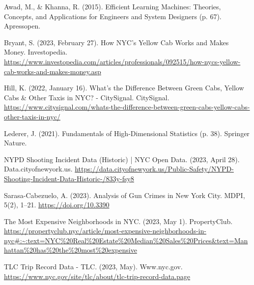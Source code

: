 \documentclass[11pt]{article}
\begin{document}
\printbibliography
\begin{thebibliography}{9}
Awad, M., \& Khanna, R. (2015). Efficient Learning Machines: Theories, Concepts, and Applications for Engineers and System Designers (p. 67). Apressopen.

Bryant, S. (2023, February 27). How NYC’s Yellow Cab Works and Makes Money. Investopedia. \url{https://www.investopedia.com/articles/professionals/092515/how-nycs-yellow-cab-works-and-makes-money.asp}

Hill, K. (2022, January 16). What’s the Difference Between Green Cabs, Yellow Cabs \& Other Taxis in NYC? - CitySignal. CitySignal. \url{https://www.citysignal.com/whats-the-difference-between-green-cabs-yellow-cabs-other-taxis-in-nyc/}

Lederer, J. (2021). Fundamentals of High-Dimensional Statistics (p. 38). Springer Nature.

NYPD Shooting Incident Data (Historic) | NYC Open Data. (2023, April 28). Data.cityofnewyork.us. \url{https://data.cityofnewyork.us/Public-Safety/NYPD-Shooting-Incident-Data-Historic-/833y-fsy8}

Sarasa-Cabezuelo, A. (2023). Analysis of Gun Crimes in New York City. MDPI, 5(2), 1–21. \url{https://doi.org/10.3390}

The Most Expensive Neighborhoods in NYC. (2023, May 1). PropertyClub. \url{https://propertyclub.nyc/article/most-expensive-neighborhoods-in-nyc\#:~:text=NYC\%20Real\%20Estate\%20Median\%20Sales\%20Prices\&text=Manhattan\%20has\%20the\%20most\%20expensive}

TLC Trip Record Data - TLC. (2023, May). Www.nyc.gov. \url{https://www.nyc.gov/site/tlc/about/tlc-trip-record-data.page}


\end{thebibliography}
\end{document}
